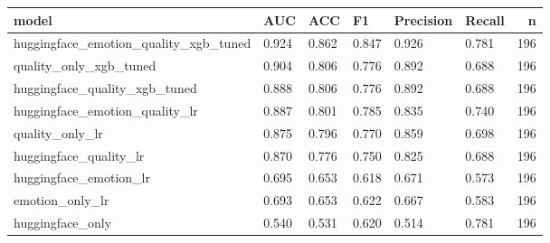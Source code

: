 \begin{tabular}{llllllr}
\toprule
model & AUC & ACC & F1 & Precision & Recall & n \\
\midrule
huggingface\_emotion\_quality\_xgb\_tuned & 0.924 & 0.862 & 0.847 & 0.926 & 0.781 & 196 \\
quality\_only\_xgb\_tuned & 0.904 & 0.806 & 0.776 & 0.892 & 0.688 & 196 \\
huggingface\_quality\_xgb\_tuned & 0.888 & 0.806 & 0.776 & 0.892 & 0.688 & 196 \\
huggingface\_emotion\_quality\_lr & 0.887 & 0.801 & 0.785 & 0.835 & 0.740 & 196 \\
quality\_only\_lr & 0.875 & 0.796 & 0.770 & 0.859 & 0.698 & 196 \\
huggingface\_quality\_lr & 0.870 & 0.776 & 0.750 & 0.825 & 0.688 & 196 \\
huggingface\_emotion\_lr & 0.695 & 0.653 & 0.618 & 0.671 & 0.573 & 196 \\
emotion\_only\_lr & 0.693 & 0.653 & 0.622 & 0.667 & 0.583 & 196 \\
huggingface\_only & 0.540 & 0.531 & 0.620 & 0.514 & 0.781 & 196 \\
\bottomrule
\end{tabular}
